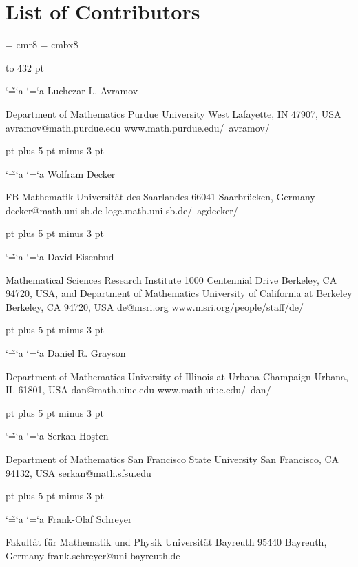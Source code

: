 

\twocolumn
\bgroup


    \chapter*{List of Contributors}
    \parindent=0pt
    \font\afont = cmr8 \afont \baselineskip=9pt
    \font\bfont = cmbx8
    \def\addr#1{%
        \vskip 12pt
        \bgroup
        \catcode`\~=\the\catcode`a
        \catcode`\@=\the\catcode`a
        \obeylines
        {\bfont #1}%
        \vskip 2pt
        }
    \def\endaddr{\egroup}

    \def\aspace{\vskip 0 pt plus 5 pt minus 3 pt}

    \vbox to 432 pt {

        \addr{Luchezar L. Avramov}
                Department of Mathematics
                Purdue University
                West Lafayette, IN 47907, USA
                avramov@math.purdue.edu
                www.math.purdue.edu/~avramov/
        \endaddr

        \aspace

        \addr{Wolfram Decker}
                FB Mathematik
                Universit\"at des Saarlandes
                66041 Saarbr\"ucken, Germany
                decker@math.uni-sb.de
                loge.math.uni-sb.de/~agdecker/
        \endaddr

        \aspace

        \addr{David Eisenbud}
                Mathematical Sciences Research Institute
                1000 Centennial Drive
                Berkeley, CA 94720, USA,
                and
                Department of Mathematics
                University of California at Berkeley
                Berkeley, CA 94720, USA
                de@msri.org
                www.msri.org/people/staff/de/
        \endaddr

        \aspace

        \addr{Daniel R. Grayson}
                Department of Mathematics
                University of Illinois at Urbana-Champaign
                Urbana, IL 61801, USA
                dan@math.uiuc.edu
                www.math.uiuc.edu/~dan/
        \endaddr

        \aspace

        \addr{Serkan Ho\c{s}ten}
                Department of Mathematics
                San Francisco State University
                San Francisco, CA 94132, USA
                serkan@math.sfsu.edu
        \endaddr

        \aspace

        \addr{Frank-Olaf Schreyer}
                Fakult\"at f\"ur Mathematik und Physik
                Universit\"at Bayreuth
                95440 Bayreuth, Germany
                frank.schreyer@uni-bayreuth.de
        \endaddr

    }

